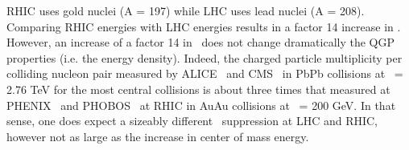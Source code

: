 


RHIC uses gold nuclei (A = 197) while LHC uses lead nuclei
(A = 208). Comparing RHIC energies with LHC energies results in a
factor 14 increase in \snn. However, an increase of a factor 14 in
\snn\ does not change dramatically the QGP properties (i.e. the energy
density). Indeed, the charged particle multiplicity per colliding
nucleon pair measured by ALICE~\cite{Aamodt:2010cz} and
CMS~\cite{pbpbmult} in PbPb collisions at \snn\ = 2.76 TeV for the most
central collisions is about three times that measured at
PHENIX~\cite{Adler:2004zn} and PHOBOS~\cite{Alver:2010ck} at RHIC in
AuAu collisions at \snn\ = 200 GeV. In that sense, one does expect a
sizeably different \PgU\ suppression at LHC and RHIC, however not as
large as the increase in center of mass energy.


